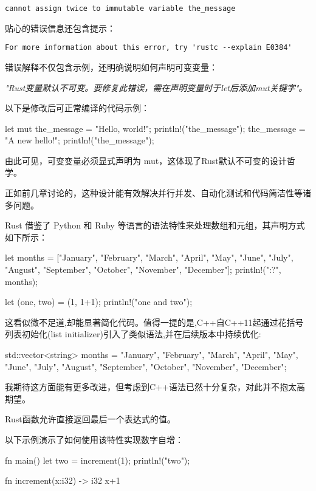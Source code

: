\verb|cannot assign twice to immutable variable the_message| 

贴心的错误信息还包含提示：

\verb|For more information about this error, try 'rustc --explain E0384'|

错误解释不仅包含示例，还明确说明如何声明可变变量：

\textit{"Rust变量默认不可变。要修复此错误，需在声明变量时于let后添加mut关键字"。}

以下是修改后可正常编译的代码示例：

\begin{rust}
let mut the_message = "Hello, world!";
println!("{the_message}");
the_message = "A new hello!";
println!("{the_message}");
\end{rust}

由此可见，可变变量必须显式声明为 mut，这体现了Rust默认不可变的设计哲学。

正如前几章讨论的，这种设计能有效解决并行并发、自动化测试和代码简洁性等诸多问题。


Rust 借鉴了 Python 和 Ruby 等语言的语法特性来处理数组和元组，其声明方式如下所示：

\begin{rust}
let months = ["January", "February", "March", "April", "May", "June", "July", "August", "September", "October", "November", "December"];
println!("{:?}", months);

let (one, two) = (1, 1+1);
println!("{one} and {two}");
\end{rust}

这看似微不足道,却能显著简化代码。值得一提的是,C++自C++11起通过花括号列表初始化(list initializer)引入了类似语法,并在后续版本中持续优化:

\begin{rust}
std::vector<string> months = {"January", "February", "March", "April", "May", "June", "July", "August", "September", "October", "November", "December"};
\end{rust}

我期待这方面能有更多改进，但考虑到C++语法已然十分复杂，对此并不抱太高期望。


Rust函数允许直接返回最后一个表达式的值。

以下示例演示了如何使用该特性实现数字自增：

\begin{rust}
fn main() {
  let two = increment(1);
  println!("{two}");
}

fn increment(x:i32) -> i32{
  x+1
}
\end{rust}

